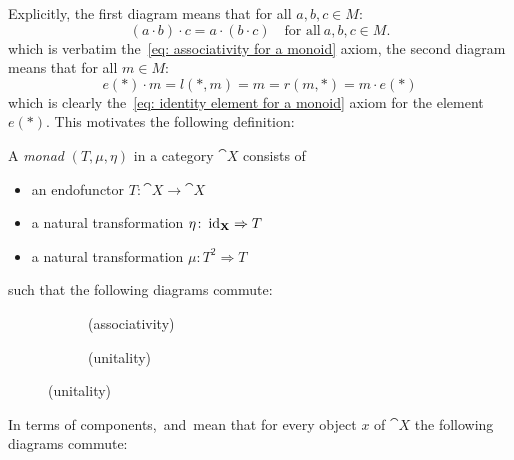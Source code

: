 Explicitly, the first diagram means that for all $a,b,c \in M$:
\[
    (a \cdot b) \cdot c = a \cdot (b \cdot c) 
    \quad \text{for all} \ a,b,c \in M.
\]
which is verbatim the~\ref{eq: associativity for a monoid} axiom, the second diagram means that for all $m \in M$:
\[
  e(\ast) \cdot m = l(\ast,m) = m = r(m,\ast) = m \cdot e(\ast)  
\]
which is clearly the~\ref{eq: identity element for a monoid} axiom 
for the element $e(\ast)$.
This motivates the following definition:
\begin{definition}[monad]
A \textit{monad} $(T,\mu, \eta) $ in a category $\cat{X}$ consists of
\begin{itemize}
    \item an endofunctor $T\colon \cat{X} \to \cat{X}$
    \item a natural transformation $\eta \colon \operatorname{id}_{\mathbf{X}} \Rightarrow T$ 
    \item a natural transformation $\mu\colon T^2 \Rightarrow T $
\end{itemize}  
such that the following diagrams commute:
\begin{figure}[H]
    \centering
    \begin{subfigure}{0.3\textwidth}
        \centering
        \label{dia: associativity}
        \caption*{(associativity)}
    \end{subfigure}
    \hspace{2em}
    \begin{subfigure}{0.3\textwidth}
        \centering
        \label{dia: unitality}
        \caption*{(unitality)}
    \end{subfigure} 
\end{figure}

In terms of components,~ and~ mean that for every object $x$ of $\cat{X}$
the following diagrams commute:


\end{definition}
